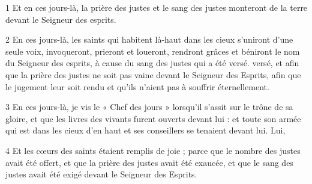 \par 1 Et en ces jours-là, la prière des justes et le sang des justes monteront de la terre devant le Seigneur des esprits.
\par 2 En ces jours-là, les saints qui habitent là-haut dans les cieux s'uniront d'une seule voix, invoqueront, prieront et loueront, rendront grâces et béniront le nom du Seigneur des esprits, à cause du sang des justes qui a été versé. versé, et afin que la prière des justes ne soit pas vaine devant le Seigneur des Esprits, afin que le jugement leur soit rendu et qu'ils n'aient pas à souffrir éternellement.
\par 3 En ces jours-là, je vis le « Chef des jours » lorsqu'il s'assit sur le trône de sa gloire, et que les livres des vivants furent ouverts devant lui : et toute son armée qui est dans les cieux d'en haut et ses conseillers se tenaient devant lui. Lui,
\par 4 Et les cœurs des saints étaient remplis de joie ; parce que le nombre des justes avait été offert, et que la prière des justes avait été exaucée, et que le sang des justes avait été exigé devant le Seigneur des Esprits.


